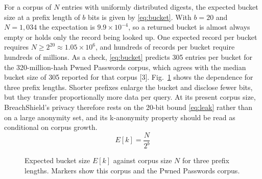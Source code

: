 \documentclass[10pt,twocolumn]{article}
\begin{document}
For a corpus of $N$ entries with uniformly distributed digests, the expected bucket size at a prefix length of $b$ bits is given by \eqref{eq:bucket}. With $b=20$ and $N=1{,}034$ the expectation is $9.9\times10^{-4}$, so a returned bucket is almost always empty or holds only the record being looked up. One expected record per bucket requires $N\ge 2^{20}\approx 1.05\times10^{6}$, and hundreds of records per bucket require hundreds of millions. As a check, \eqref{eq:bucket} predicts 305 entries per bucket for the 320-million-hash Pwned Passwords corpus, which agrees with the median bucket size of 305 reported for that corpus [3]. Fig.~\ref{fig:bucket} shows the dependence for three prefix lengths. Shorter prefixes enlarge the bucket and disclose fewer bits, but they transfer proportionally more data per query. At its present corpus size, BreachShield's privacy therefore rests on the 20-bit bound \eqref{eq:leak} rather than on a large anonymity set, and its k-anonymity property should be read as conditional on corpus growth.
\begin{equation}
E[k]=\frac{N}{2^{b}}
\label{eq:bucket}
\end{equation}

\begin{figure}[!t]
\centering
{}
\caption{Expected bucket size $E[k]$ against corpus size $N$ for three prefix lengths. Markers show this corpus and the Pwned Passwords corpus.}
\label{fig:bucket}
\end{figure}
\end{document}
